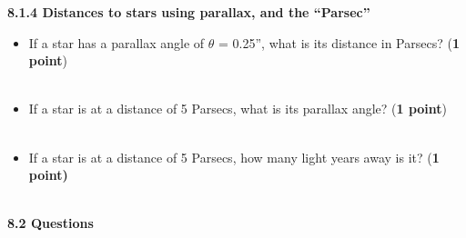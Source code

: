 \documentclass[notitlepage]{article}
\begin{document}
\large{\bf 8.1.4 Distances to stars using parallax, and the ``Parsec''}\\
\begin{itemize}
\item If a star has a parallax angle of $\theta$ = 0.25'', what is its distance in Parsecs? ({\bf 1 point})\\\\

\item If a star is at a distance of 5 Parsecs, what is its parallax angle? ({\bf 1 point})\\\\

\item If a star is at a distance of 5 Parsecs, how many light years away is it? ({\bf 1 point)}\\\\

\end{itemize}







\large{\bf 8.2 Questions}
\end{document}
